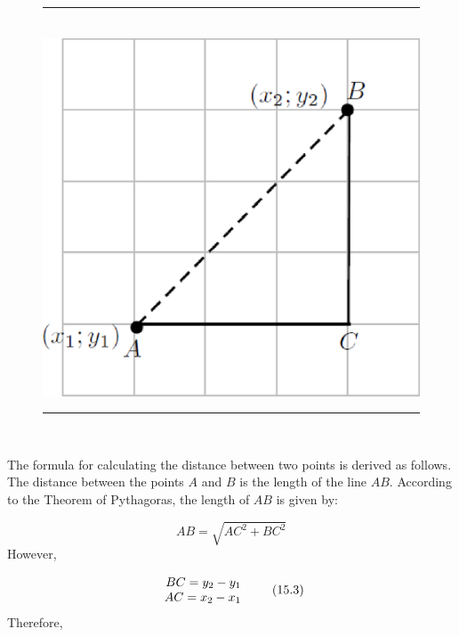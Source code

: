     \setcounter{subfigure}{0}
	\begin{figure}[H] %
    \begin{center}
    \rule[.1in]{\figurerulewidth}{.005in} \\
        \label{m39107*uid39!!!underscore!!!media}\label{m39107*uid39!!!underscore!!!printimage}\includegraphics[width=0.5\columnwidth]{col11306.imgs/m39107_MG10C14_016.png} %
      \vspace{2pt}
    \vspace{.1in}
    \rule[.1in]{\figurerulewidth}{.005in} \\
    \end{center}
 \end{figure}       
        \label{m39107*id67214}The formula for calculating the distance between two points is derived as follows. The distance between the points $A$ and $B$ is the length of the line $AB$. According to the Theorem of Pythagoras, the length of $AB$ is given by:\par 
        \label{m39107*id67261}\nopagebreak\noindent{}
          
    \begin{equation}
    AB=\sqrt{A{C}^{2}+B{C}^{2}}\tag{15.2}
      \end{equation}
        \label{m39107*id67300}However,\par 
        \label{m39107*id67306}\nopagebreak\noindent{}
          
    \begin{equation}
    \begin{array}{cc}\hfill BC={y}_{2}-{y}_{1}\\ \hfill AC={x}_{2}-{x}_{1}\end{array}\tag{15.3}
      \end{equation}
        \label{m39107*id67375}Therefore,\par 
        \label{m39107*id67379}\nopagebreak\noindent{}
          
